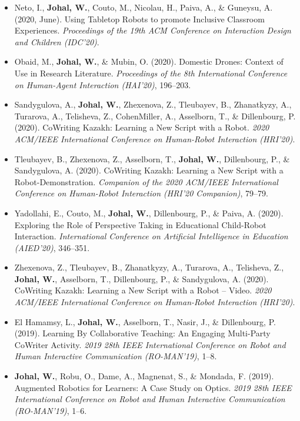 \begin{itemize}[nosep]
    \item Neto, I., \textbf{Johal, W.}, Couto, M., Nicolau, H., Paiva, A., \& Guneysu, A. (2020, June). Using Tabletop Robots to promote Inclusive Classroom Experiences. \textit{Proceedings of the 19th ACM Conference on Interaction Design and Children (IDC'20)}.

    \item Obaid, M., \textbf{Johal, W.}, \& Mubin, O. (2020). Domestic Drones: Context of Use in Research Literature. \textit{Proceedings of the 8th International Conference on Human-Agent Interaction (HAI'20)}, 196--203.

    \item Sandygulova, A., \textbf{Johal, W.}, Zhexenova, Z., Tleubayev, B., Zhanatkyzy, A., Turarova, A., Telisheva, Z., CohenMiller, A., Asselborn, T., \& Dillenbourg, P. (2020). CoWriting Kazakh: Learning a New Script with a Robot. \textit{2020 ACM/IEEE International Conference on Human-Robot Interaction (HRI'20)}.

    \item Tleubayev, B., Zhexenova, Z., Asselborn, T., \textbf{Johal, W.}, Dillenbourg, P., \& Sandygulova, A. (2020). CoWriting Kazakh: Learning a New Script with a Robot-Demonstration. \textit{Companion of the 2020 ACM/IEEE International Conference on Human-Robot Interaction (HRI'20 Companion)}, 79--79.

    \item Yadollahi, E., Couto, M., \textbf{Johal, W.}, Dillenbourg, P., \& Paiva, A. (2020). Exploring the Role of Perspective Taking in Educational Child-Robot Interaction. \textit{International Conference on Artificial Intelligence in Education (AIED'20)}, 346--351.

    \item Zhexenova, Z., Tleubayev, B., Zhanatkyzy, A., Turarova, A., Telisheva, Z., \textbf{Johal, W.}, Asselborn, T., Dillenbourg, P., \& Sandygulova, A. (2020). CoWriting Kazakh: Learning a New Script with a Robot -- Video. \textit{2020 ACM/IEEE International Conference on Human-Robot Interaction (HRI'20)}.

    \item El Hamamsy, L., \textbf{Johal, W.}, Asselborn, T., Nasir, J., \& Dillenbourg, P. (2019). Learning By Collaborative Teaching: An Engaging Multi-Party CoWriter Activity. \textit{2019 28th IEEE International Conference on Robot and Human Interactive Communication (RO-MAN'19)}, 1--8.

    \item \textbf{Johal, W.}, Robu, O., Dame, A., Magnenat, S., \& Mondada, F. (2019). Augmented Robotics for Learners: A Case Study on Optics. \textit{2019 28th IEEE International Conference on Robot and Human Interactive Communication (RO-MAN'19)}, 1--6.


\end{itemize}
